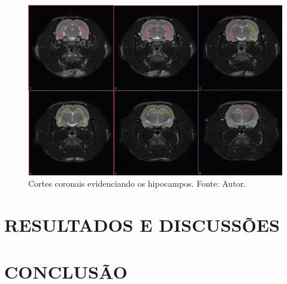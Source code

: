 \documentclass[a4paper, 12pt]{article}
\begin{document}
\begin{figure}[H]
\centering
\includegraphics[scale=0.5]{Hipocampos.PNG}
\caption{Cortes coronais evidenciando os hipocampos. Fonte: Autor.}
\label{Fig:hipocampos}
\end{figure}	

\Blindtext

\pagebreak

\newpage

\section{RESULTADOS E DISCUSSÕES}
\label{Sec:Res_Dis}

\Blindtext

\pagebreak
\newpage
\section{CONCLUSÃO}

\blindtext

\pagebreak

\singlespacing
{}
\pagestyle{referencias}
\nocite{Prince:2014, Purcell:1946, Theodoridis:2009}



\end{document}
